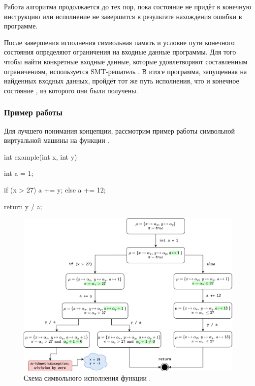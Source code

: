 Работа алгоритма продолжается до тех пор, пока состояние не придёт в конечную инструкцию или исполнение не завершится в результате нахождения ошибки в программе.

После завершения исполнения символьная память и условие пути конечного состояния  определяют ограничения на входные данные программы. Для того чтобы найти конкретные входные данные, которые удовлетворяют составленным ограничениям, используется SMT-решатель \cite{smt}. В итоге программа, запущенная на найденных входных данных, пройдёт тот же путь исполнения, что и конечное состояние , из которого они были получены.

\subsubsection{Пример работы}

Для лучшего понимания концепции, рассмотрим пример работы символьной виртуальной машины на функции .

\begin{code}
int example(int x, int y) {
    int a = 1;

    if (x > 27) {
        a += y;
    } else {
        a += 12;
    }

    return y / a;
}
\end{code}

\begin{figure}[ht]
    \includegraphics[scale=0.28]{images/se-example-200.png}
    \caption{\label{se-example} Схема символьного исполнения функции .}
\end{figure}

